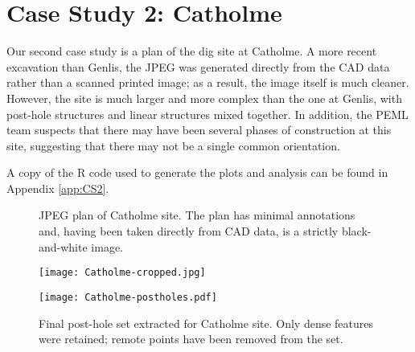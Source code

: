 \documentclass[../../ArchStats.tex]{subfiles}
\begin{document}
\section{Case Study 2: Catholme}
\label{sec:CS2}

Our second case study is a plan of the dig site at Catholme. A more recent excavation than Genlis, the JPEG was generated directly from the CAD data rather than a scanned printed image; as a result, the image itself is much cleaner. However, the site is much larger and more complex than the one at Genlis, with post-hole structures and linear structures mixed together. In addition, the PEML team suspects that there may have been several phases of construction at this site, suggesting that there may not be a single common orientation. 

A copy of the R code used to generate the plots and analysis can be found in Appendix \ref{app:CS2}.

 \begin{figure}[!ht]
 \begin{minipage}[t]{0.47\textwidth}
 \caption{JPEG plan of Catholme site. The plan has minimal annotations and, having been taken directly from CAD data, is a strictly black-and-white image.}
 \centering
 \texttt{[image: Catholme-cropped.jpg]}
 \end{minipage}
 \hfill
	\begin{minipage}[t]{0.47\textwidth}
	\caption{Final post-hole set extracted for Catholme site. Only dense features were retained; remote points have been removed from the set.}
	\label{fig:Catholme-f-ext-postholes}
	\centering
	\texttt{[image: Catholme-postholes.pdf]}
    \end{minipage}
 \end{figure}
 
\end{document}
